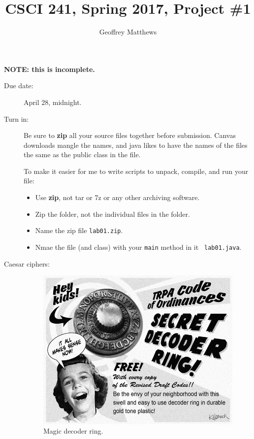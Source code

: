 \documentclass{article}
\title{CSCI 241, Spring 2017, Project \#1}
\author{Geoffrey Matthews}
\begin{document}
\maketitle

\centerline{\bf NOTE:  this is incomplete.}

\begin{description}
\item[Due date:]  April 28, midnight.

\item[Turn in:] Be sure to {\bf zip} all your source files together
  before submission.  Canvas downloads mangle the names, and java
  likes to have the names of the files the same as the public class in
  the file.

  To make
  it easier for me to write scripts to unpack, compile, and run your
  file:
  \begin{itemize}
    \item
      Use {\bf zip}, not tar or 7z or any other archiving software.
      \item Zip the folder, not the individual  files in the folder.
      \item Name the zip file {\tt lab01.zip}.
\item
  Nmae the file (and class) with your {\tt main} method in it {\tt
    lab01.java}. 
  \end{itemize}
  
\item[Caesar ciphers:]

  \begin{figure}
  \centerline{\includegraphics[scale=0.25]{secretdecoderring.jpg}  }
  \caption{Magic decoder ring.}
  \label{magicring}
  \end{figure}
  

\end{description}
\end{document}

